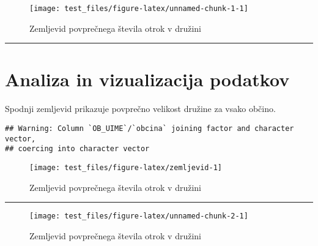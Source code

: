\documentclass[]{article}
\begin{document}
\begin{figure}

{\centering \texttt{[image: test\_files/figure-latex/unnamed-chunk-1-1]} 

}

\caption{Zemljevid povprečnega števila otrok v družini}\label{fig:unnamed-chunk-1}
\end{figure}

\begin{center}\rule{0.5\linewidth}{\linethickness}\end{center}

\section{Analiza in vizualizacija
podatkov}\label{analiza-in-vizualizacija-podatkov}

Spodnji zemljevid prikazuje povprečno velikost družine za vsako občino.

\begin{verbatim}
## Warning: Column `OB_UIME`/`obcina` joining factor and character vector,
## coercing into character vector
\end{verbatim}

\begin{figure}

{\centering \texttt{[image: test\_files/figure-latex/zemljevid-1]} 

}

\caption{Zemljevid povprečnega števila otrok v družini}\label{fig:zemljevid}
\end{figure}

\begin{center}\rule{0.5\linewidth}{\linethickness}\end{center}

\begin{figure}

{\centering \texttt{[image: test\_files/figure-latex/unnamed-chunk-2-1]} 

}

\caption{Zemljevid povprečnega števila otrok v družini}\label{fig:unnamed-chunk-2}
\end{figure}
\end{document}
